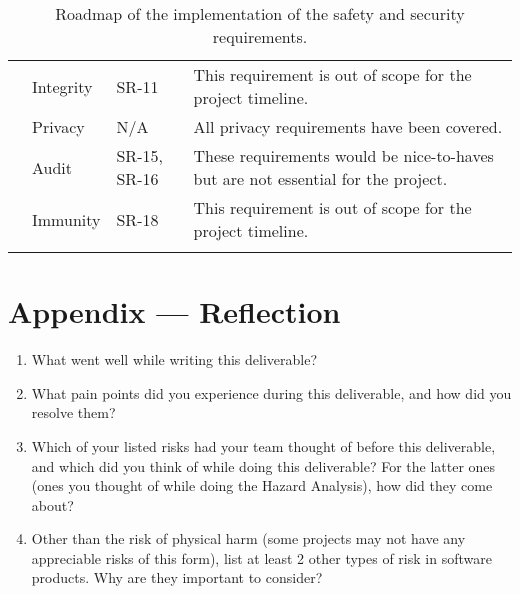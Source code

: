 \documentclass{article}
\begin{document}
\begin{longtable}[c]{|m{2cm}|m{2.6cm}|m{2cm}|m{3.8cm}|}
    \cline{2-4}
    & Integrity & SR-11 & This requirement is out of scope for the project timeline.\\
    \cline{2-4}
    & Privacy & N/A & All privacy requirements have been covered.\\
    \cline{2-4}
    & Audit & SR-15, SR-16 & These requirements would be nice-to-haves but are not essential for the project.\\
    \cline{2-4}
    & Immunity & SR-18 & This requirement is out of scope for the project timeline.\\
    \hline
    \caption{Roadmap of the implementation of the safety and security requirements.}
\end{longtable}

\newpage{}

\section*{Appendix --- Reflection}




\begin{enumerate}
    \item What went well while writing this deliverable? 
    \item What pain points did you experience during this deliverable, and how
    did you resolve them?
    \item Which of your listed risks had your team thought of before this
    deliverable, and which did you think of while doing this deliverable? For
    the latter ones (ones you thought of while doing the Hazard Analysis), how
    did they come about?
    \item Other than the risk of physical harm (some projects may not have any
    appreciable risks of this form), list at least 2 other types of risk in
    software products. Why are they important to consider?
\end{enumerate}
\end{document}
